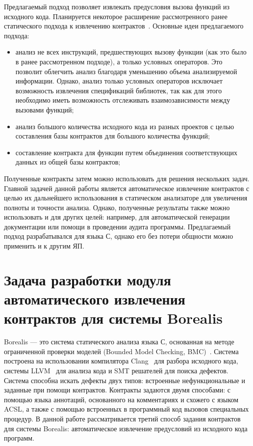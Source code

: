 Предлагаемый подход позволяет извлекать предусловия вызова функций из исходного кода. Планируется некоторое расширение рассмотренного ранее статического подхода к извлечению контрактов~\cite{staticPredicateMining}. Основные идеи предлагаемого подхода:
\begin{itemize}
\item анализ не всех инструкций, предшествующих вызову функции (как это было в ранее рассмотренном подходе), а только условных операторов. Это позволит облегчить анализ благодаря уменьшению объема анализируемой информации. Однако, анализ только условных операторов исключает возможность извлечения спецификаций библиотек, так как для этого необходимо иметь возможность отслеживать взаимозависимости между вызовами функций;
\item анализ большого количества исходного кода из разных проектов с целью составления базы контрактов для большого количества функций;
\item составление контракта для функции путем объединения соответствующих данных из общей базы контрактов;
\end{itemize}

Полученные контракты затем можно использовать для решения нескольких задач. Главной задачей данной работы является автоматическое извлечение контрактов с целью их дальнейшего использования в статическом анализаторе для увеличения полноты и точности анализа. Однако, полученные результаты также можно использовать и для других целей: например, для автоматической генерации документации или помощи в проведении аудита программы. Предлагаемый подход разрабатывался для языка С, однако его без потери общности можно применить и к другим ЯП.

\section{Задача разработки модуля автоматического извлечения контрактов для системы Borealis}
Borealis --- это система статического анализа языка С, основанная на методе ограниченной проверки моделей (Bounded Model Checking, BMC)~\cite{bmc}. Система построена на использовании компилятора Clang~\cite{clang} для разбора исходного кода, системы LLVM~\cite{llvm} для анализа кода и SMT решателей для поиска дефектов. Система способна искать дефекты двух типов: встроенные нефункциональные и заданные при помощи контрактов. Контракты задаются двумя способами: с помощью языка аннотаций, основанного на комментариях и схожего с языком ACSL, а также с помощью встроенных в программный код вызовов специальных процедур. В данной работе рассматривается третий способ задания контрактов для системы Borealis: автоматическое извлечение предусловий из исходного кода программ.

